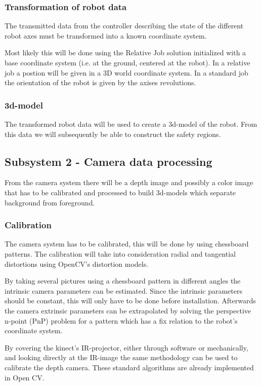 \documentclass[10pt,a4paper,english]{article}
\begin{document}
\subsubsection{Transformation of robot data}

The transmitted data from the controller describing the state of the different robot axes must be transformed into a known coordinate system.

Most likely this will be done using the Relative Job solution initialized with a base coordinate system (i.e. at the ground, centered at the robot). In a relative job a postion will be given in a 3D world coordinate system. In a standard job the orientation of the robot is given by the axises revolutions.  

\subsubsection{3d-model}

The transformed robot data will be used to create a 3d-model of the robot. From this data we will subsequently be able to construct the safety regions.

\subsection{Subsystem 2 - Camera data processing}

From the camera system there will be a depth image and possibly a color image that has to be calibrated and processed to build 3d-models which separate background from foreground.

\subsubsection{Calibration}

The camera system has to be calibrated, this will be done by using chessboard patterns. The calibration will take into consideration radial and tangential distortions using OpenCV's distortion models.

By taking several pictures using a chessboard pattern in different angles the intrinsic camera parameters can be estimated. Since the intrinsic parameters should be constant, this will only have to be done before installation. Afterwards the camera extrinsic parameters can be extrapolated by solving the perspective n-point (PnP) problem for a pattern which has a fix relation to the robot's coordinate system.

By covering the kinect's IR-projector, either through software or mechanically, and looking directly at the IR-image the same methodology can be used to calibrate the depth camera.
These standard algorithms are already implemented in Open CV.\cite{opencv-calibration}
\end{document}
